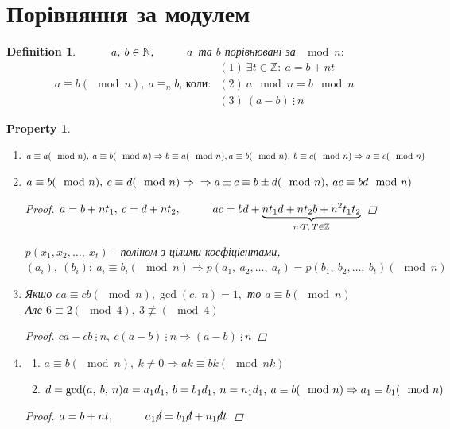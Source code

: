 \documentclass[a4paper,12pt, centered]{bookest}
\newtheorem{definition}{Definition}[section]
\newtheorem*{property*}{Property}
\newcommand\tab[1][1cm]{\hspace*{#1}}
\begin{document}
\section{Порівняння за модулем}
\begin{definition}
	$\tab a,\>b\in\mathbb{N},\tab a$ та $b$ порівнювані за $\mod n:
	$
	$$a\equiv b(\mod n),\>a\equiv_nb\textrm{, коли: } \begin{array}{l}
		(1)\>\exists t\in\mathbb{Z}:\>a=b+nt \\
		(2)\>a\mod n=b\mod n\\
		(3)\>(a-b)\>\vdots\>n
	\end{array}$$
\end{definition}
\begin{property*}$ $
	\begin{enumerate}
		\item $a\equiv a(\mod n),\>a\equiv b(\mod n)\Rightarrow b\equiv a(\mod n),\\a\equiv b(\mod n),\> b\equiv c(\mod n)\Rightarrow a\equiv c(\mod n)$
		\item $a\equiv b(\mod n),\>c\equiv d(\mod n)\Rightarrow \\\Rightarrow a\pm c \equiv b\pm d(\mod n),\>ac\equiv bd\mod n)$\begin{proof}
			$a=b+nt_1,\> c=d+nt_2,\tab ac=bd +\underbrace{nt_1d+nt_2b+n^2t_1t_2}_{n\cdot T,\>T\in\mathbb{Z}}$
		\end{proof}
		$p(x_1,x_2,\dots,\>x_t)$ - поліном з цілими коєфіціентами,\\$(a_i),\>(b_i):\>a_i\equiv b_i(\mod n)\Rightarrow p(a_1,\>a_2,\dots,\>a_t)=p(b_1,\>b_2,\dots,\>b_t)(\mod n)$
		\item Якщо $ca\equiv cb(\mod n),\gcd (c,\>n)=1,$ то $a\equiv b(\mod n)$\\ Але $6\equiv 2(\mod 4),\>3\not\equiv (\mod 4)$\begin{proof}
			$ca-cb\>\vdots\>n,\>c(a-b)\>\vdots\>n\Rightarrow (a-b)\>\vdots\>n$
		\end{proof} 
		\item \begin{enumerate} 
		\item $a\equiv b(\mod n),\>k\ne 0\Rightarrow ak\equiv bk (\mod nk)$
		\item $d=\gcd (a,\>b,\>n)\\a=a_1d_1,\>b=b_1d_1,\>n=n_1d_1,\>a\equiv b(\mod n)\Rightarrow a_1\equiv b_1(\mod n)$\end{enumerate} \begin{proof}
			$a=b+nt,\tab a_1\cancel{d}=b_1\cancel{d}+n_1\cancel{d}t$

\end{proof}
\end{enumerate}
\end{property*}
\end{document}
